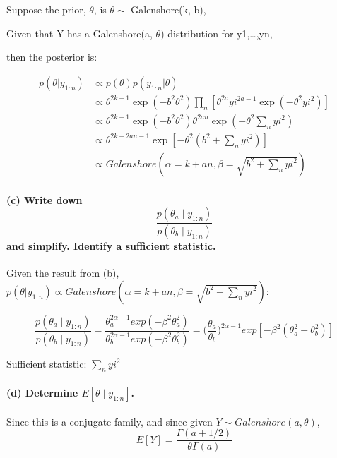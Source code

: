 \documentclass[]{article}
\let\oldparagraph\paragraph
\renewcommand{\paragraph}[1]{\oldparagraph{#1}\mbox{}}
\begin{document}
Suppose the prior, \(\theta\), is \(\theta \sim\) Galenshore(k, b),

Given that Y has a Galenshore(a, \(\theta\)) distribution for
y1,\ldots{},yn,

then the posterior is:

\[\begin{align}p(\theta|y_{1:n}) & \propto p(\theta)p(y_{1:n}|\theta)\\
& \propto \theta^{2k-1}\exp(-b^2\theta^2 )\prod_n [\theta^{2a}yi^{2a-1}\exp(-\theta^2yi^2)]\\
& \propto \theta^{2k-1}\exp(-b^2\theta^2 )\theta^{2an}\exp(-\theta^2\sum_n yi^2)\\
& \propto \theta^{2k+2an-1}\exp[-\theta^2(b^2+\sum_n yi^2)]\\
& \propto Galenshore(\alpha = k+an,\beta = \sqrt{b^2+\sum_n yi^2})
\end{align}\]

\paragraph{\texorpdfstring{(c) Write down
\[\frac{p(\theta_a \mid y_{1:n})}{p(\theta_b \mid y_{1:n})}\] and
simplify. Identify a sufficient
statistic.}{(c) Write down \textbackslash{}frac\{p(\textbackslash{}theta\_a \textbackslash{}mid y\_\{1:n\})\}\{p(\textbackslash{}theta\_b \textbackslash{}mid y\_\{1:n\})\} and simplify. Identify a sufficient statistic.}}\label{c-write-down-fracptheta_a-mid-y_1nptheta_b-mid-y_1n-and-simplify.-identify-a-sufficient-statistic.}

Given the result from (b),
\(p(\theta|y_{1:n}) \propto Galenshore(\alpha = k+an,\beta = \sqrt{b^2+\sum_n yi^2})\):

\[\frac{p(\theta_a \mid y_{1:n})}{p(\theta_b \mid y_{1:n})} = \frac{\theta_a^{2\alpha-1}exp(-\beta^2\theta_a^2)}{\theta_b^{2\alpha-1}exp(-\beta^2\theta_b^2)} = \bigg( \frac{\theta_a}{\theta_b}\bigg)^{2\alpha-1}exp[-\beta^2(\theta_a^2-\theta_b^2)]\]

Sufficient statistic: \(\sum_n yi^2\)

\paragraph{\texorpdfstring{(d) Determine
\(E[\theta \mid y_{1:n}]\).}{(d) Determine E{[}\textbackslash{}theta \textbackslash{}mid y\_\{1:n\}{]}.}}\label{d-determine-etheta-mid-y_1n.}

Since this is a conjugate family, and since given
\(Y \sim Galenshore(a,\theta)\),
\[E[Y] = \frac{\Gamma(a +1/2)}{\theta \Gamma(a)}\]
\end{document}
